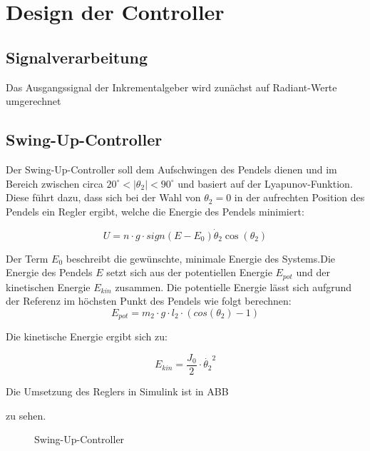 \section{Design der Controller}
\label{sec.Controller}
\subsection{Signalverarbeitung}
\label{signalverarbeitung} 
Das Ausgangssignal der Inkrementalgeber wird zunächst auf Radiant-Werte umgerechnet 

\subsection{Swing-Up-Controller}
\label{Swing-Up-Controller} 

Der Swing-Up-Controller soll dem Aufschwingen des Pendels dienen und im Bereich zwischen circa $20^\circ < \left| \theta_2 \right| < 90^\circ$  und basiert auf der Lyapunov-Funktion. Diese führt dazu, dass sich bei der Wahl von
$ \theta_2 = 0$ in der aufrechten Position des Pendels ein Regler ergibt, welche die Energie des Pendels minimiert:

\begin{equation}
U = n \cdot g \cdot sign(E-E_0)\dot{\theta}_2\cos(\theta_2)
\end{equation}

Der Term $E_0$ beschreibt die gewünschte, minimale Energie des Systems.Die Energie des Pendels $E$ setzt sich aus der potentiellen Energie $E_{pot}$ und der kinetischen Energie $E_{kin}$ zusammen. Die potentielle Energie lässt sich aufgrund der Referenz im höchsten Punkt des Pendels wie folgt berechnen:
\begin{equation}
E_{pot} = m_2 \cdot g \cdot l_2 \cdot (cos(\theta_2)-1)
\end{equation}

Die kinetische Energie ergibt sich zu:

\begin{equation}
E_{kin} = \frac{J_0}{2} \cdot \dot{\theta_2}^2
\end{equation}

Die Umsetzung des Reglers in Simulink ist in ABB %

zu sehen. 

\begin{figure}[h!]
  \caption{Swing-Up-Controller}
  \centering
\end{figure}


